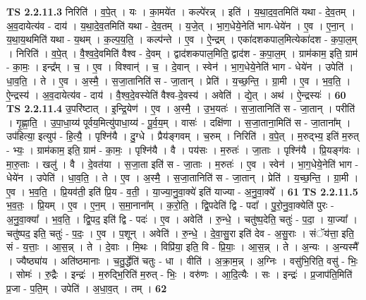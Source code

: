 \documentclass[17pt]{extarticle}
\begin{document}
                  \newline
                                \textbf{ TS 2.2.11.3} \newline
                  निरिति॑ । व॒पे॒त् । यः । का॒मये॑त । कल्पे॑रन्न् । इति॑ । य॒था॒द॒व॒तमिति॑ यथा - दे॒व॒तम् । अ॒व॒दायेत्य॑व - दाय॑ । य॒था॒दे॒व॒तमिति॑ यथा - दे॒व॒तम् । य॒जे॒त् । भा॒ग॒धेये॒नेति॑ भाग-धेये॑न । ए॒व । ए॒ना॒न् । य॒था॒य॒थमिति॑ यथा - य॒थम् । क॒ल्प॒य॒ति॒ । कल्प॑न्ते । ए॒व । ऐ॒न्द्रम् । एका॑दशकपाल॒मित्येका॑दश - क॒पा॒ल॒म् । निरिति॑ । व॒पे॒त् । वै॒श्व॒दे॒वमिति॑ वैश्व - दे॒वम् । द्वाद॑शकपाल॒मिति॒ द्वाद॑श - क॒पा॒ल॒म् । ग्राम॑काम॒ इति॒ ग्राम॑ - का॒मः॒ । इन्द्र᳚म् । च॒ । ए॒व । विश्वान्॑ । च॒ । दे॒वान् । स्वेन॑ । भा॒ग॒धेये॒नेति॑ भाग - धेये॑न । उपेति॑ । धा॒व॒ति॒ । ते । ए॒व । अ॒स्मै॒ । स॒जा॒तानिति॑ स - जा॒तान् । प्रेति॑ । य॒च्छ॒न्ति॒ । ग्रा॒मी । ए॒व । भ॒व॒ति॒ । ऐ॒न्द्रस्य॑ । अ॒व॒दायेत्य॑व - दाय॑ । वै॒श्व॒दे॒वस्येति॑ वैश्व-दे॒वस्य॑ । अवेति॑ । द्ये॒त् । अथ॑ । ऐ॒न्द्रस्यः॑ । \textbf{  60} \newline
                  \newline
                                \textbf{ TS 2.2.11.4} \newline
                  उ॒परि॑ष्टात् । इ॒न्द्रि॒येण॑ । ए॒व । अ॒स्मै॒ । उ॒भ॒यतः॑ । स॒जा॒तानिति॑ स - जा॒तान् । परीति॑ । गृ॒ह्णा॒ति॒ । उ॒पा॒धा॒य्य॑ पूर्वय॒मित्यु॑पाधा॒य्य॑ - पू॒र्व॒य॒म् । वासः॑ । दक्षि॑णा । स॒जा॒ताना॒मिति॑ स - जा॒ताना᳚म् । उप॑हित्या॒ इत्युप॑ - हि॒त्यै॒ । पृश्नि॑यै । दु॒ग्धे । प्रैय॑ङ्गवम् । च॒रुम् । निरिति॑ । व॒पे॒त् । म॒रुद्भ्य॒ इति॑ म॒रुत् - भ्यः॒ । ग्राम॑काम॒ इति॒ ग्राम॑ - का॒मः॒ । पृश्नि॑यै । वै । पय॑सः । म॒रुतः॑ । जा॒ताः । पृश्नि॑यै । प्रि॒यङ्ग॑वः । मा॒रु॒ताः । खलु॑ । वै । दे॒वत॑या । स॒जा॒ता इति॑ स - जा॒ताः । म॒रुतः॑ । ए॒व । स्वेन॑ । भा॒ग॒धेये॒नेति॑ भाग - धेये॑न । उपेति॑ । धा॒व॒ति॒ । ते । ए॒व । अ॒स्मै॒ । स॒जा॒तानिति॑ स - जा॒तान् । प्रेति॑ । य॒च्छ॒न्ति॒ । ग्रा॒मी । ए॒व । भ॒व॒ति॒ । प्रि॒यव॑ती॒ इति॑ प्रि॒य - व॒ती॒ । या॒ज्या॒नु॒वा॒क्ये॑ इति॑ याज्या - अ॒नु॒वा॒क्ये᳚ । \textbf{  61} \newline
                  \newline
                                \textbf{ TS 2.2.11.5} \newline
                  भ॒व॒तः॒ । प्रि॒यम् । ए॒व । ए॒न॒म् । स॒मा॒नाना᳚म् । क॒रो॒ति॒ । द्वि॒पदेति॑ द्वि - पदा᳚ । पु॒रो॒नु॒वा॒क्येति॑ पुरः - अ॒नु॒वा॒क्या᳚ । भ॒व॒ति॒ । द्वि॒पद॒ इति॑ द्वि - पदः॑ । ए॒व । अवेति॑ । रु॒न्धे॒ । चतु॑ष्प॒देति॒ चतुः॑ - प॒दा॒ । या॒ज्या᳚ । चतु॑ष्पद॒ इति॒ चतुः॑ - प॒दः॒ । ए॒व । प॒शून् । अवेति॑ । रु॒न्धे॒ । दे॒वा॒सु॒रा इति॑ देव - अ॒सु॒राः । संॅय॑त्ता॒ इति॒ सं - य॒त्ताः॒ । आ॒स॒न्न् । ते । दे॒वाः । मि॒थः । विप्रि॑या॒ इति॒ वि - प्रि॒याः॒ । आ॒स॒न्न् । ते । अ॒न्यः । अ॒न्यस्मै᳚ । ज्यैष्ठ्या॑य । अति॑ष्ठमानाः । च॒तु॒र्द्धेति॑ चतुः - धा । वीति॑ । अ॒क्रा॒म॒न्न् । अ॒ग्निः । वसु॑भि॒रिति॒ वसु॑ - भिः॒ । सोमः॑ । रु॒द्रैः । इन्द्रः॑ । म॒रुद्भि॒रिति॑ म॒रुत् - भिः॒ । वरु॑णः । आ॒दि॒त्यैः । सः । इन्द्रः॑ । प्र॒जाप॑ति॒मिति॑ प्र॒जा - प॒ति॒म् । उपेति॑ । अ॒धा॒व॒त् । तम् । \textbf{  62} \newline
\end{document}
